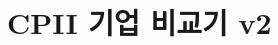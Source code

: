 \documentclass[11pt,a4paper]{report}
\begin{document}
\chapter{CPII 기업 비교기 v2}
\label{app:cpii_comparator_v2_method}
\label{app:comparator-v2}





\end{document}
